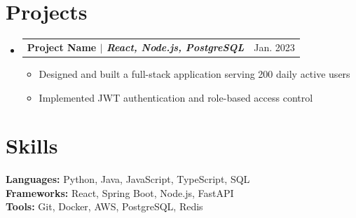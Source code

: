 \documentclass[letterpaper,11pt]{article}
\makeatletter
\newcommand{\resumeItem}[1]{
  \item\small{#1 \vspace{-1pt}}
}
\newcommand{\resumeProjectHeading}[2]{
  \item
    \begin{tabular*}{\textwidth}{l@{\extracolsep{\fill}}r}
      \textbf{\color{textbase}#1} & {\color{midgray}\small #2} \\
    \end{tabular*}\vspace{-4pt}
}
\newcommand{\resumeSubHeadingListStart}{\begin{itemize}[leftmargin=0in,label={}]}
\newcommand{\resumeSubHeadingListEnd}{\end{itemize}}
\newcommand{\resumeItemListStart}{\begin{itemize}[nosep,leftmargin=0.15in,label={\color{tealprimary}\small\textbullet}]}
\newcommand{\resumeItemListEnd}{\end{itemize}\vspace{0pt}}
\makeatother
\begin{document}
\section{Projects}
\resumeSubHeadingListStart

\resumeProjectHeading
{\textbf{Project Name} $|$ \textit{React, Node.js, PostgreSQL}}{Jan. 2023}
\resumeItemListStart
\resumeItem{Designed and built a full-stack application serving 200 daily active users}
\resumeItem{Implemented JWT authentication and role-based access control}
\resumeItemListEnd

\resumeSubHeadingListEnd

\section{Skills}
\begin{itemize}[leftmargin=0in,label={}]
  \small{\item{
    \textbf{Languages:} Python, Java, JavaScript, TypeScript, SQL \\
    \textbf{Frameworks:} React, Spring Boot, Node.js, FastAPI \\
    \textbf{Tools:} Git, Docker, AWS, PostgreSQL, Redis
  }}
\end{itemize}
\end{document}
